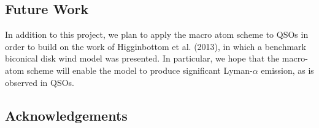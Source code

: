 \documentclass[preprint, a4paper, 11pt]{aastex}
\begin{document}
\subsection{Future Work}

In addition to this project, we plan to apply the macro atom scheme to QSOs in order to build on the work of Higginbottom et al. (2013),
in which a benchmark biconical disk wind model was presented. In particular, we hope that the macro-atom scheme will enable the
model to produce significant Lyman-$\alpha$ emission, as is observed in QSOs.


\subsection*{Acknowledgements}




\end{document}

